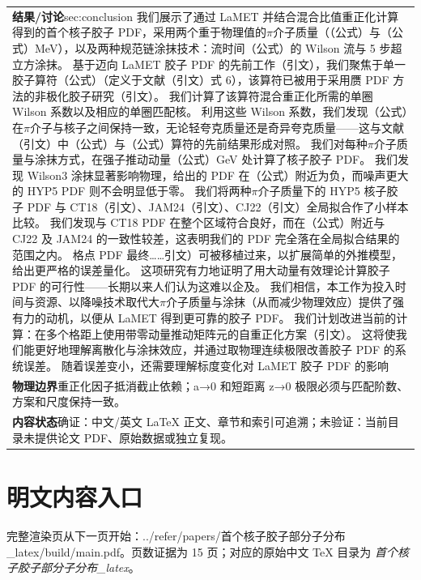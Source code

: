 \documentclass[UTF8,11pt,oneside]{ctexbook}
\begin{document}
\begin{table}[htbp]
\begin{tabular}{@{}p{}@{}}
    \textbf{结果/讨论}\quad sec:conclusion 我们展示了通过 LaMET 并结合混合比值重正化计算得到的首个核子胶子 PDF，采用两个重于物理值的$\pi$介子质量（（公式）与（公式）MeV），以及两种规范链涂抹技术：流时间（公式）的 Wilson 流与 5 步超立方涂抹。 基于迈向 LaMET 胶子 PDF 的先前工作（引文），我们聚焦于单一胶子算符（公式）（定义于文献（引文）式 6），该算符已被用于采用赝 PDF 方法的非极化胶子研究（引文）。 我们计算了该算符混合重正化所需的单圈 Wilson 系数以及相应的单圈匹配核。 利用这些 Wilson 系数，我们发现（公式）在$\pi$介子与核子之间保持一致，无论轻夸克质量还是奇异夸克质量——这与文献（引文）中（公式）与（公式）算符的先前结果形成对照。 我们对每种$\pi$介子质量与涂抹方式，在强子推动动量（公式）GeV 处计算了核子胶子 PDF。 我们发现 Wilson3 涂抹显著影响物理，给出的 PDF 在（公式）附近为负，而噪声更大的 HYP5 PDF 则不会明显低于零。 我们将两种$\pi$介子质量下的 HYP5 核子胶子 PDF 与 CT18（引文）、JAM24（引文）、CJ22（引文）全局拟合作了小样本比较。 我们发现与 CT18 PDF 在整个区域符合良好，而在（公式）附近与 CJ22 及 JAM24 的一致性较差，这表明我们的 PDF 完全落在全局拟合结果的范围之内。 格点 PDF 最终……引文）可被移植过来，以扩展简单的外推模型，给出更严格的误差量化。 这项研究有力地证明了用大动量有效理论计算胶子 PDF 的可行性——长期以来人们认为这难以企及。 我们相信，本工作为投入时间与资源、以降噪技术取代大$\pi$介子质量与涂抹（从而减少物理效应）提供了强有力的动机，以便从 LaMET 得到更可靠的胶子 PDF。 我们计划改进当前的计算：在多个格距上使用带零动量推动矩阵元的自重正化方案（引文）。 这将使我们能更好地理解离散化与涂抹效应，并通过取物理连续极限改善胶子 PDF 的系统误差。 随着误差变小，还需要理解标度变化对 LaMET 胶子 PDF 的影响 \\
    \textbf{物理边界}\quad 重正化因子抵消截止依赖；a→0 和短距离 z→0 极限必须与匹配阶数、方案和尺度保持一致。 \\
    \textbf{内容状态}\quad 确证：中文/英文 LaTeX 正文、章节和索引可追溯；未验证：当前目录未提供论文 PDF、原始数据或独立复现。 \\
    \bottomrule
  \end{tabular}
\end{table}
\section*{明文内容入口}
\noindent 完整渲染页从下一页开始：../\allowbreak{}refer/\allowbreak{}papers/\allowbreak{}首个核子胶子部分子分布\_\allowbreak{}latex/\allowbreak{}build/\allowbreak{}main.pdf。页数证据为 15 页；对应的原始中文 TeX 目录为 \emph{首个核子胶子部分子分布\_latex}。
\clearpage

\clearpage
\end{document}
